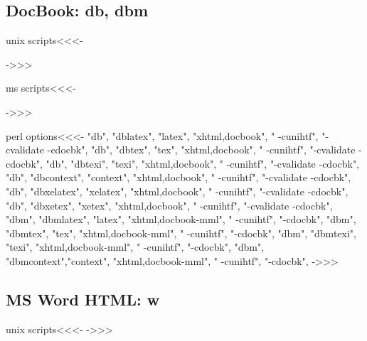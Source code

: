 \documentclass{article}
\begin{document}
\subsection{DocBook: db, dbm}

\<unix scripts\><<<-

->>>

\<ms scripts\><<<-

->>>



\<perl options\><<<-
 "db",  "dblatex",   "latex",   "xhtml,docbook",     " -cunihtf",  "-cvalidate -cdocbk",
 "db",  "dbtex",     "tex",     "xhtml,docbook",     " -cunihtf",  "-cvalidate -cdocbk",
 "db",  "dbtexi",    "texi",    "xhtml,docbook",     " -cunihtf",  "-cvalidate -cdocbk",
 "db",  "dbcontext", "context", "xhtml,docbook",     " -cunihtf",  "-cvalidate -cdocbk",
 "db",  "dbxelatex",   "xelatex",   "xhtml,docbook",     " -cunihtf",  "-cvalidate -cdocbk",
 "db",  "dbxetex",     "xetex",     "xhtml,docbook",     " -cunihtf",  "-cvalidate -cdocbk",
 "dbm", "dbmlatex",  "latex",   "xhtml,docbook-mml", " -cunihtf",  "-cdocbk",
 "dbm", "dbmtex",    "tex",     "xhtml,docbook-mml", " -cunihtf",  "-cdocbk",
 "dbm", "dbmtexi",   "texi",    "xhtml,docbook-mml", " -cunihtf",  "-cdocbk",
 "dbm", "dbmcontext","context", "xhtml,docbook-mml", " -cunihtf",  "-cdocbk",
->>>



\subsection{MS Word HTML: w}


\<unix scripts\><<<-
->>>
\end{document}
